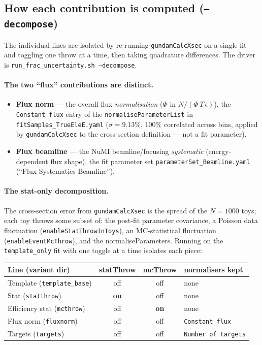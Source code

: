 \documentclass[11pt]{article}
\newcommand{\code}[1]{\texttt{#1}}
\begin{document}
\subsection{How each contribution is computed (\code{--decompose})}
\label{sec:decompose}

The individual lines are isolated by re-running \code{gundamCalcXsec} on a single
fit and toggling one throw at a time, then taking quadrature differences. The
driver is \code{run\_frac\_uncertainty.sh --decompose}.

\paragraph{The two ``flux'' contributions are distinct.}
\begin{itemize}
  \item \textbf{Flux norm} --- the overall flux \emph{normalisation}
    ($\Phi$ in $N/(\Phi\,T\,\epsilon)$), the \code{Constant flux} entry of the
    \code{normaliseParameterList} in \code{fitSamples\_TrueEleE.yaml}
    ($\sigma=9.13\%$, $100\%$ correlated across bins, applied by
    \code{gundamCalcXsec} to the cross-section definition --- not a fit parameter).
  \item \textbf{Flux beamline} --- the NuMI beamline/focusing \emph{systematic}
    (energy-dependent flux shape), the fit parameter set
    \code{parameterSet\_Beamline.yaml} (``Flux Systematics Beamline'').
\end{itemize}

\paragraph{The stat-only decomposition.} The cross-section error from
\code{gundamCalcXsec} is the spread of the $N=1000$ toys; each toy throws some
subset of: the post-fit parameter covariance, a Poisson data fluctuation
(\code{enableStatThrowInToys}), an MC-statistical fluctuation
(\code{enableEventMcThrow}), and the normaliseParameters. Running on the
\code{template\_only} fit with one toggle at a time isolates each piece:

\begin{center}
\begin{tabular}{@{}lccl@{}}
\toprule
Line (variant dir) & statThrow & mcThrow & normalisers kept \\
\midrule
Template (\code{template\_base}) & off & off & none \\
Stat (\code{statthrow})          & \textbf{on}  & off & none \\
Efficiency stat (\code{mcthrow}) & off & \textbf{on}  & none \\
Flux norm (\code{fluxnorm})      & off & off & \code{Constant flux} \\
Targets (\code{targets})         & off & off & \code{Number of targets} \\
\bottomrule
\end{tabular}
\end{center}
\end{document}
